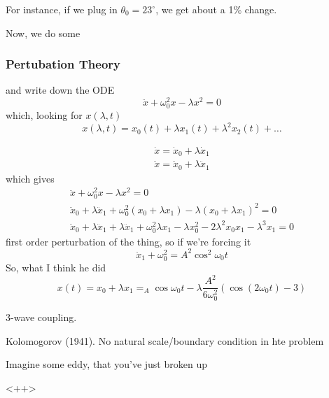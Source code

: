 \documentclass{article}
\theoremstyle{definition}
\begin{document}
For instance, if we plug in $\theta_0=23^\circ$, we get about a 1\% change.

Now, we do some
\subsubsection{Pertubation Theory}
and write down the ODE
\begin{equation}
	\ddot x+\omega_0^2x-\lambda x^2=0
\end{equation}
which, looking for $x(\lambda,t)$
\begin{equation}
x(\lambda,t)=x_0(t)+\lambda x_1(t)+\lambda^2 x_2(t)+\ldots
\end{equation}

\begin{align}
\dot x=\dot x_0+\lambda \dot x_1
\\
\ddot x=\ddot x_0+\lambda \ddot x_1
\end{align}
which gives
\begin{align}
	\ddot x+\omega_0^2x-\lambda x^2=0
	\\
	\ddot x_0+\lambda\ddot x_1+\omega_0^2(x_0+\lambda x_1)-\lambda(x_0+\lambda x_1)^2=0
	\\
	\ddot x_0+\lambda\ddot x_1+\lambda \ddot x_1+\omega_0^2\lambda x_1-\lambda x_0^2-2\lambda^2x_0x_1-\lambda^3x_1=0
\end{align}
first order perturbation of the thing, so if we're forcing it
\begin{equation}
\ddot x_1+\omega_0^2=A^2\cos^2\omega_0t
\end{equation}
So, what I think he did
\begin{equation}
	x(t)=x_0+\lambda x_1=_A\cos\omega_0 t-\lambda\frac{A^2}{6\omega_0^2}(\cos(2\omega_0 t)-3)
\end{equation}

3-wave coupling.

Kolomogorov (1941). No natural scale/boundary condition in hte problem

Imagine some eddy, that you've just broken up
\begin{center}
\end{center}
<++>
\end{document}
